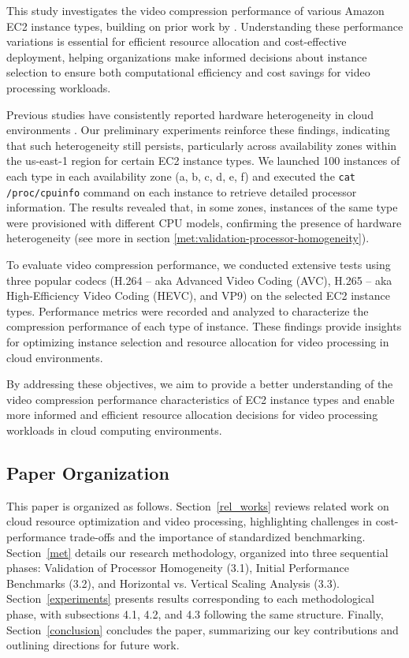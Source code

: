 \documentclass[conference]{IEEEtran}
\begin{document}
	This study investigates the video compression performance of various Amazon EC2 instance types, building on prior work by \cite{tamara_dancheva_635e0512}. Understanding these performance variations is essential for efficient resource allocation and cost-effective deployment, helping organizations make informed decisions about instance selection to ensure both computational efficiency and cost savings for video processing workloads.
	
	Previous studies have consistently reported hardware heterogeneity in cloud environments \cite{pedro__lvarez_ed947120, zhonghong_ou_93958397, zhonghong_ou_2f9f325e, benjamin_farley_32066261}. Our preliminary experiments reinforce these findings, indicating that such heterogeneity still persists, particularly across availability zones within the us-east-1 region for certain EC2 instance types. We launched 100 instances of each type in each availability zone (a, b, c, d, e, f) and executed the \texttt{cat /proc/cpuinfo} command on each instance to retrieve detailed processor information. The results revealed that, in some zones, instances of the same type were provisioned with different CPU models, confirming the presence of hardware heterogeneity (see more in section \ref{met:validation-processor-homogeneity}).
	
	To evaluate video compression performance, we conducted extensive tests using three popular codecs (H.264 -- aka Advanced Video Coding (AVC), H.265 -- aka High-Efficiency Video Coding (HEVC), and VP9) on the selected EC2 instance types. Performance metrics were recorded and analyzed to characterize the compression performance of each type of instance. These findings provide insights for optimizing instance selection and resource allocation for video processing in cloud environments.
	
	By addressing these objectives, we aim to provide a better understanding of the video compression performance characteristics of EC2 instance types and enable more informed and efficient resource allocation decisions for video processing workloads in cloud computing environments.
	
	\subsection{Paper Organization}
	
	This paper is organized as follows. Section~\ref{rel_works} reviews related work on cloud resource optimization and video processing, highlighting challenges in cost-performance trade-offs and the importance of standardized benchmarking. Section~\ref{met} details our research methodology, organized into three sequential phases: Validation of Processor Homogeneity (3.1), Initial Performance Benchmarks (3.2), and Horizontal vs. Vertical Scaling Analysis (3.3). Section~\ref{experiments} presents results corresponding to each methodological phase, with subsections 4.1, 4.2, and 4.3 following the same structure. Finally, Section~\ref{conclusion} concludes the paper, summarizing our key contributions and outlining directions for future work.
	
\end{document}

